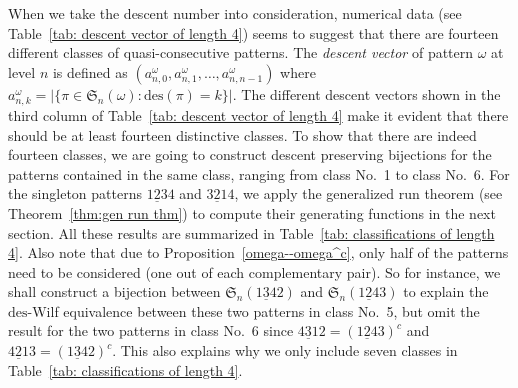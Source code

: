 \documentclass[11pt,reqno]{amsart}
\numberwithin{equation}{section}
\theoremstyle{plain}
\theoremstyle{definition}
\renewcommand{\S}{\mathfrak{S}}
\def\des{\mathrm{des}}
\begin{document}
When we take the descent number into consideration, numerical data (see Table~\ref{tab: descent vector of length 4}) seems to suggest that there are fourteen different classes of quasi-consecutive patterns. The \textit{descent vector} of pattern $\omega$ at level $n$ is defined as $(a_{n,0}^{\omega},a_{n,1}^{\omega},\ldots,a_{n,n-1}^{\omega})$
where $a_{n,k}^{\omega}=|\{\pi\in \S_n(\omega):\des(\pi)=k\}|$. The different descent vectors shown in the third column of Table~\ref{tab: descent vector of length 4} make it evident that there should be at least fourteen distinctive classes. To show that there are indeed fourteen classes, we are going to construct descent preserving bijections for the patterns contained in the same class, ranging from class No.~1 to class No.~6. For the singleton patterns $\underline{123}4$ and $\underline{321}4$, we apply the generalized run theorem (see Theorem~\ref{thm:gen run thm}) to compute their generating functions in the next section. All these results are summarized in Table~\ref{tab: classifications of length 4}. Also note that due to Proposition~\ref{omega--omega^c}, only half of the patterns need to be considered (one out of each complementary pair). So for instance, we shall construct a bijection between $\S_n(\underline{134}2)$ and $\S_n(\underline{124}3)$ to explain the $\des$-Wilf equivalence between these two patterns in class No.~5, but omit the result for the two patterns in class No.~6 since $\underline{431}2=(\underline{124}3)^c$ and $\underline{421}3=(\underline{134}2)^c$. This also explains why we only include seven classes in Table~\ref{tab: classifications of length 4}.
\end{document}
